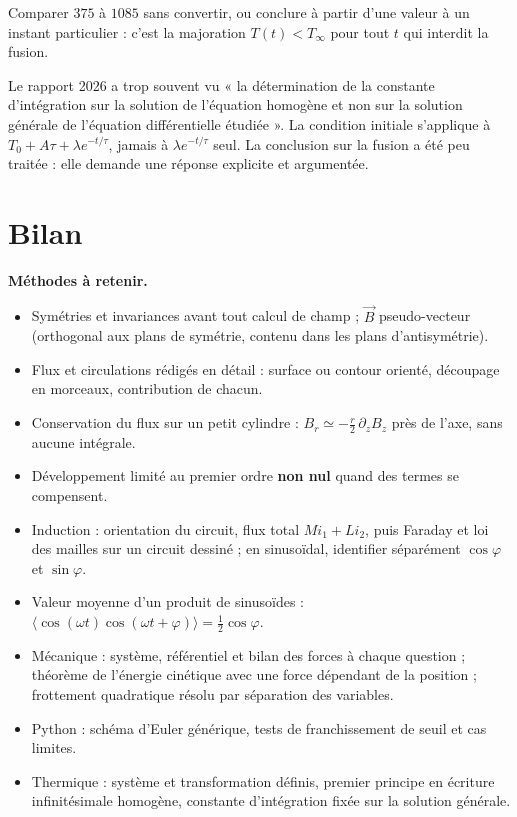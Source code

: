 \documentclass[11pt,a4paper]{article}
\providecommand{\tightlist}{\setlength{\itemsep}{0pt}\setlength{\parskip}{0pt}}
\begin{document}
\begin{piege}

Comparer \(375\) à \(1085\) sans convertir, ou conclure à partir d'une valeur à un instant particulier : c'est la majoration \(T(t)<T_\infty\) pour tout \(t\) qui interdit la fusion.

\end{piege}

\begin{jury}

Le rapport 2026 a trop souvent vu « la détermination de la constante d'intégration sur la solution de l'équation homogène et non sur la solution générale de l'équation différentielle étudiée ». La condition initiale s'applique à \(T_0+A\tau+\lambda e^{-t/\tau}\), jamais à \(\lambda e^{-t/\tau}\) seul. La conclusion sur la fusion a été peu traitée : elle demande une réponse explicite et argumentée.

\end{jury}

\hypertarget{bilan}{%
\section{Bilan}\label{bilan}}

\textbf{Méthodes à retenir.}

\begin{itemize}
\tightlist
\item
  Symétries et invariances avant tout calcul de champ ; \(\vec B\) pseudo-vecteur (orthogonal aux plans de symétrie, contenu dans les plans d'antisymétrie).
\item
  Flux et circulations rédigés en détail : surface ou contour orienté, découpage en morceaux, contribution de chacun.
\item
  Conservation du flux sur un petit cylindre : \(B_r\simeq-\frac r2\,\partial_zB_z\) près de l'axe, sans aucune intégrale.
\item
  Développement limité au premier ordre \textbf{non nul} quand des termes se compensent.
\item
  Induction : orientation du circuit, flux total \(Mi_1+Li_2\), puis Faraday et loi des mailles sur un circuit dessiné ; en sinusoïdal, identifier séparément \(\cos\varphi\) et \(\sin\varphi\).
\item
  Valeur moyenne d'un produit de sinusoïdes : \(\langle\cos(\omega t)\cos(\omega t+\varphi)\rangle=\frac12\cos\varphi\).
\item
  Mécanique : système, référentiel et bilan des forces à chaque question ; théorème de l'énergie cinétique avec une force dépendant de la position ; frottement quadratique résolu par séparation des variables.
\item
  Python : schéma d'Euler générique, tests de franchissement de seuil et cas limites.
\item
  Thermique : système et transformation définis, premier principe en écriture infinitésimale homogène, constante d'intégration fixée sur la solution générale.
\end{itemize}
\end{document}
